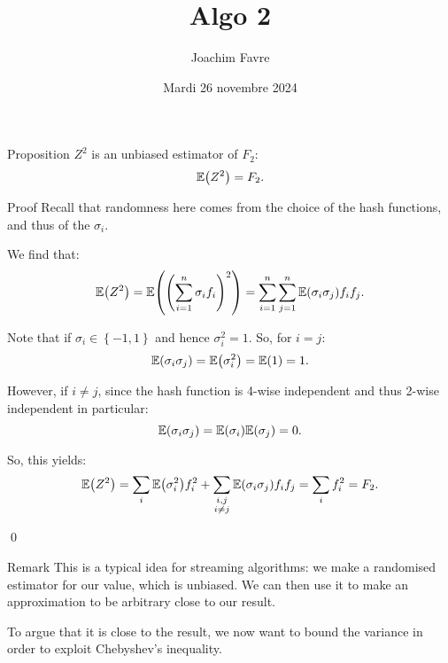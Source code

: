 \documentclass[a4paper]{article}
\title{Algo 2}
\author{Joachim Favre}
\date{Mardi 26 novembre 2024}
\begin{document}
\maketitle


\begin{parag}{Proposition}
    $Z^2$ is an unbiased estimator of $F_2$: 
    \[\exval\left(Z^2\right) = F_2.\]

    \begin{subparag}{Proof}
        Recall that randomness here comes from the choice of the hash functions, and thus of the $\sigma_i$.

        We find that: 
        \[\exval\left(Z^2\right) = \exval\left(\left(\sum_{i=1}^n \sigma_i f_i\right)^2\right) = \sum_{i=1}^{n} \sum_{j=1}^{n} \exval\left(\sigma_i \sigma_j\right) f_i f_j.\]

        Note that if $\sigma_i \in \left\{-1, 1\right\}$ and hence $\sigma_i^2 = 1$. So, for $i = j$: 
        \[\exval\left(\sigma_i \sigma_j\right) = \exval\left(\sigma_i^2\right) = \exval\left(1\right) = 1.\]

        However, if $i \neq j$, since the hash function is 4-wise independent and thus 2-wise independent in particular: 
        \[\exval\left(\sigma_i \sigma_j\right) = \exval\left(\sigma_i\right) \exval\left(\sigma_j\right) = 0.\]

        So, this yields: 
        \[\exval\left(Z^2\right) = \sum_{i} \exval\left(\sigma_i^2\right) f_i^2 + \sum_{\substack{i, j \\ i\neq j}} \exval\left(\sigma_i \sigma_j\right) f_i f_j = \sum_{i} f_i^2 = F_2.\]
        
        \qed
    \end{subparag}

    \begin{subparag}{Remark}
        This is a typical idea for streaming algorithms: we make a randomised estimator for our value, which is unbiased. We can then use it to make an approximation to be arbitrary close to our result.

        To argue that it is close to the result, we now want to bound the variance in order to exploit Chebyshev's inequality.
    \end{subparag}
\end{parag}
\end{document}
